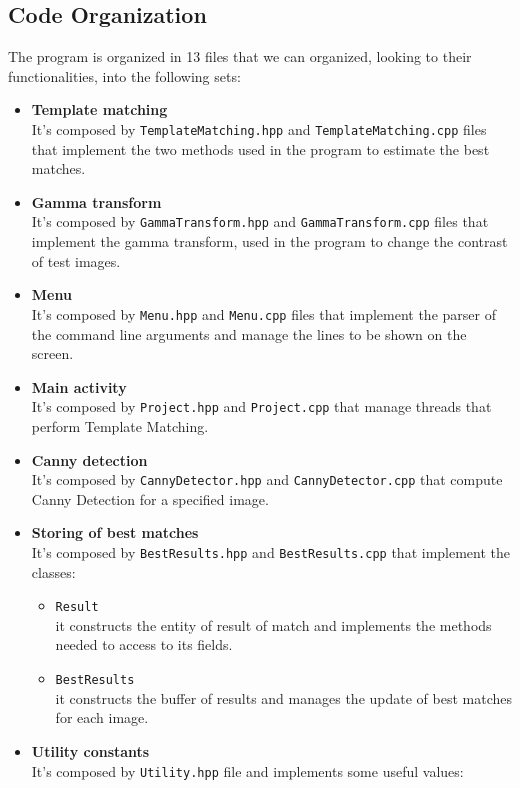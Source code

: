 \documentclass{article}
\begin{document}
\subsection{Code Organization}
The program is organized in 13 files that we can organized, looking to their functionalities, into the following sets:
\begin{itemize}
\item{\textbf{Template matching}\\
It's composed by \texttt{TemplateMatching.hpp} and \texttt{TemplateMatching.cpp} files that implement the two methods used in the program to estimate the best matches.
}
\item{\textbf{Gamma transform}\\
It's composed by \texttt{GammaTransform.hpp} and \texttt{GammaTransform.cpp} files that implement the gamma transform, used in the program to change the contrast of test images. 
}
\item{\textbf{Menu}\\
It's composed by \texttt{Menu.hpp} and \texttt{Menu.cpp} files that implement the parser of the command line arguments and manage the lines to be shown on the screen.
}
\item{\textbf{Main activity}\\
It's composed by \texttt{Project.hpp} and \texttt{Project.cpp} that manage threads that perform Template Matching.
}
\item{\textbf{Canny detection}\\
It's composed by \texttt{CannyDetector.hpp} and \texttt{CannyDetector.cpp} that compute Canny Detection for a specified image.
}
\item{\textbf{Storing of best matches}\\
It's composed by \texttt{BestResults.hpp} and \texttt{BestResults.cpp} that implement the classes:
\begin{itemize}
\item{\texttt{Result}\\
it constructs the entity of result of match and implements the methods needed to access to its fields.
}
\item{\texttt{BestResults}\\
it constructs the buffer of results and manages the update of best matches for each image.
}
\end{itemize}
}
\item{\textbf{Utility constants}\\
It's composed by \texttt{Utility.hpp} file and implements some useful values:
}
\end{itemize}
\end{document}
